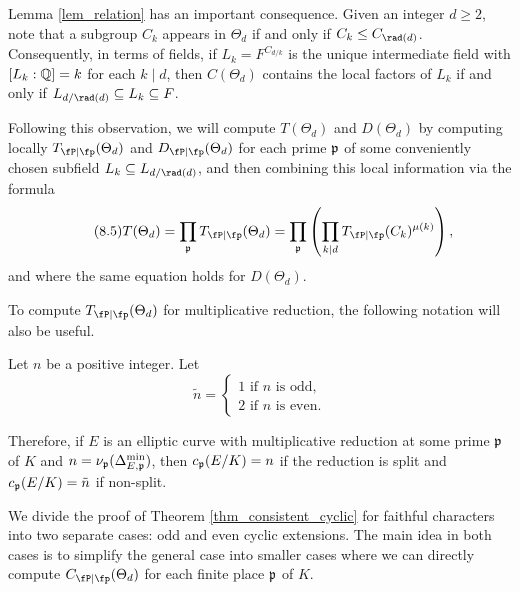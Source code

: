 \begin{rem}\label{rem_radical}
    Lemma \ref{lem_relation} has an important consequence. Given an integer $d\geq2$, note that a subgroup $C_k$ appears in $\Theta_d$ if and only if $C_k\leq C_{\rad(d)}$. Consequently, in terms of fields, if $L_k=F^{C_{d/k}}$ is the unique intermediate field with $[L_k:\mathbb{Q}]=k$ for each $k\mid d$, then $C(\Theta_d)$ contains the local factors of $L_k$ if and only if $L_{d/\rad(d)}\subseteq L_k\subseteq F$.

    Following this observation, we will compute $T(\Theta_d)$ and $D(\Theta_d)$ by computing locally $\Tp(\Theta_d)$ and $\Dp(\Theta_d)$ for each prime $\mathfrak{p}$ of some conveniently chosen subfield $L_k\subseteq L_{d/\rad(d)}$, and then combining this local information via the formula
    \begin{equation}\label{eqn_local_contr}\tag{8.5}
        T(\Theta_d)=\prod_{\pp}\Tp(\Theta_d)=\prod_\pp\left(\prod_{k\mid d} \Tp(C_k)^{\mu(k)}\right),    
    \end{equation}
    and where the same equation holds for $D(\Theta_d)$.
\end{rem}

To compute $\Tp(\Theta_d)$ for multiplicative reduction, the following notation will also be useful.

\begin{notation}\label{not_n}
    Let $n$ be a positive integer. Let 
    \[
        \tilde{n}=
        \begin{cases}
            1 \text{ if } n \text{ is odd,}\\
            2 \text{ if } n \text{ is even.}
        \end{cases}
    \]
\end{notation}
Therefore, if $E$ is an elliptic curve with multiplicative reduction at some prime $\mathfrak{p}$ of $K$ and $n=\nu_{\mathfrak{p}}(\Delta_{E,\mathfrak{p}}^{\min})$, then $c_{\mathfrak{p}}(E/K)=n$ if the reduction is split and $c_{\mathfrak{p}}(E/K)=\tilde{n}$ if non-split.

We divide the proof of Theorem \ref{thm_consistent_cyclic} for faithful characters into two separate cases: odd and even cyclic extensions. The main idea in both cases is to simplify the general case into smaller cases where we can directly compute $\Cp(\Theta_d)$ for each finite place $\mathfrak{p}$ of $K$.



 
